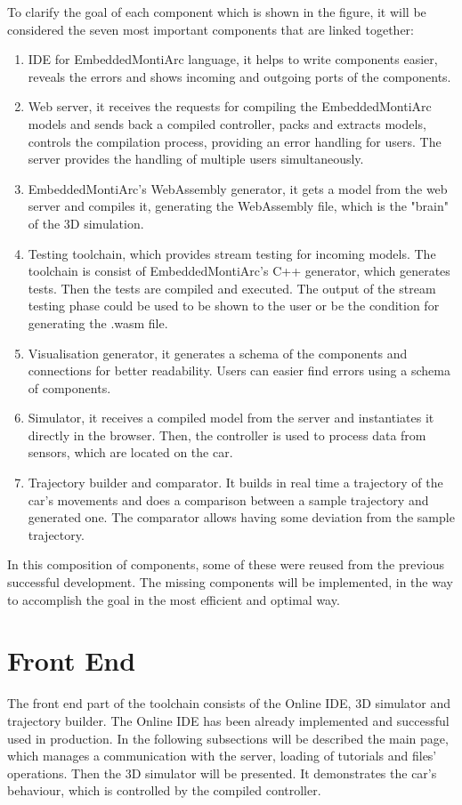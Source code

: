 To clarify the goal of each component which is shown in the figure, it will be considered the seven most important components that are linked together:
\begin{enumerate}
    \item IDE for EmbeddedMontiArc language, it helps to write components easier, reveals the errors and shows incoming and outgoing ports of the components.
    \item Web server, it receives the requests for compiling the EmbeddedMontiArc models and sends back a compiled controller, packs and extracts models, controls the compilation process, providing an error handling for users. The server provides the handling of multiple users simultaneously.
    \item EmbeddedMontiArc's WebAssembly generator, it gets a model from the web server and compiles it, generating the WebAssembly file, which is the "brain" of the 3D simulation.
    \item Testing toolchain, which provides stream testing for incoming models. The toolchain is consist of EmbeddedMontiArc's C++ generator, which generates tests. Then the tests are compiled and executed. The output of the stream testing phase could be used to be shown to the user or be the condition for generating the .wasm file.
    \item Visualisation generator, it generates a schema of the components and connections for better readability. Users can easier find errors using a schema of components.
    \item Simulator, it receives a compiled model from the server and instantiates it directly in the browser. Then, the controller is used to process data from sensors, which are located on the car.
    \item Trajectory builder and comparator. It builds in real time a trajectory of the car's movements and does a comparison between a sample trajectory and generated one. The comparator allows having some deviation from the sample trajectory.
\end{enumerate}
In this composition of components, some of these were reused from the previous successful development. The missing components will be implemented, in the way to accomplish the goal in the most efficient and optimal way.

\section{Front End}
The front end part of the toolchain consists of the Online IDE, 3D simulator and trajectory builder. The Online IDE has been already implemented and successful used in production. In the following subsections will be described the main page, which manages a communication with the server, loading of tutorials and files' operations. Then the 3D simulator will be presented. It demonstrates the car's behaviour, which is controlled by the compiled controller. 


